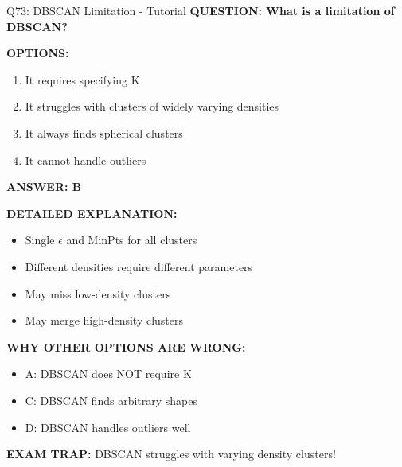 \documentclass[8pt]{beamer}
\begin{document}
	\begin{frame}{Q73: DBSCAN Limitation - Tutorial}
		\fontsize{6.5}{7.5}\selectfont
		\textbf{QUESTION: What is a limitation of DBSCAN?}
		
		\vspace{0.1cm}
		\textbf{OPTIONS:}
		\begin{enumerate}
			\item It requires specifying K
			\item It struggles with clusters of widely varying densities
			\item It always finds spherical clusters
			\item It cannot handle outliers
		\end{enumerate}
		
		\vspace{0.1cm}
		\textcolor{myblue}{\textbf{ANSWER: B}}
		
		\vspace{0.1cm}
		\textbf{DETAILED EXPLANATION:}
		\begin{itemize}
			\item Single $\epsilon$ and MinPts for all clusters
			\item Different densities require different parameters
			\item May miss low-density clusters
			\item May merge high-density clusters
		\end{itemize}
		
		\vspace{0.1cm}
		\textcolor{myred}{\textbf{WHY OTHER OPTIONS ARE WRONG:}}
		\begin{itemize}
			\item \textcolor{myred}{A:} DBSCAN does NOT require K
			\item \textcolor{myred}{C:} DBSCAN finds arbitrary shapes
			\item \textcolor{myred}{D:} DBSCAN handles outliers well
		\end{itemize}
		
		\textcolor{myred}{\textbf{EXAM TRAP:}} DBSCAN struggles with \textcolor{myblue}{varying density clusters}!
	\end{frame}
	
\end{document}
